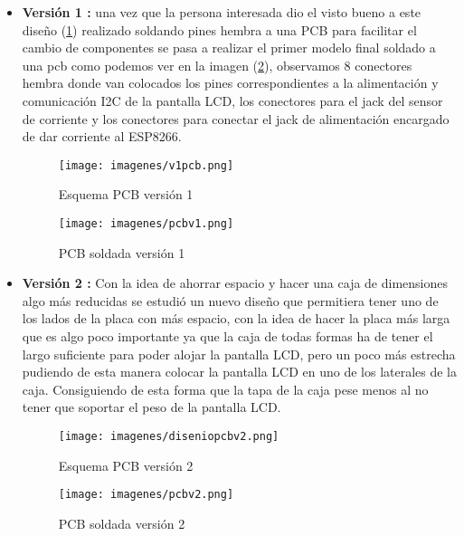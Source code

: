 \begin{itemize}
	\item \textbf{Versión 1 :} una vez que la persona interesada dio el visto bueno a este diseño (\ref{fig:pcbv1disenio}) realizado soldando pines hembra a una PCB para facilitar el cambio de componentes se pasa a realizar el primer modelo final soldado a una pcb como podemos ver en la imagen (\ref{fig:pcbv1}), observamos 8 conectores hembra donde van colocados los pines correspondientes a la alimentación y comunicación I2C de la pantalla LCD, los conectores para el jack del sensor de corriente y los conectores para conectar el jack de alimentación encargado de dar corriente al ESP8266.

	\begin{figure}[H]
		\centering
		\texttt{[image: imagenes/v1pcb.png]}
		\caption{Esquema PCB versión 1}
		\label{fig:pcbv1disenio}
	\end{figure}

	\begin{figure}[H]
		\centering
		\texttt{[image: imagenes/pcbv1.png]}
		\caption{PCB soldada versión 1}
		\label{fig:pcbv1}
	\end{figure}

	\item \textbf{Versión 2 :} Con la idea de ahorrar espacio y hacer una caja de dimensiones algo más reducidas se estudió un nuevo diseño que permitiera tener uno de los lados de la placa con más espacio, con la idea de hacer la placa más larga que es algo poco importante ya que la caja de todas formas ha de tener el largo suficiente para poder alojar la pantalla LCD, pero un poco más estrecha pudiendo de esta manera colocar la pantalla LCD en uno de los laterales de la caja. Consiguiendo de esta forma que la tapa de la caja pese menos al no tener que soportar el peso de la pantalla LCD.
	
	\begin{figure}[H]
		\centering
		\texttt{[image: imagenes/diseniopcbv2.png]}
		\caption{Esquema PCB versión 2}
		\label{fig:pcbv2disenio}
	\end{figure}
	
	\begin{figure}[H]
		\centering
		\texttt{[image: imagenes/pcbv2.png]}
		\caption{PCB soldada versión 2}
		\label{fig:pcbv2}
	\end{figure}

\end{itemize}



